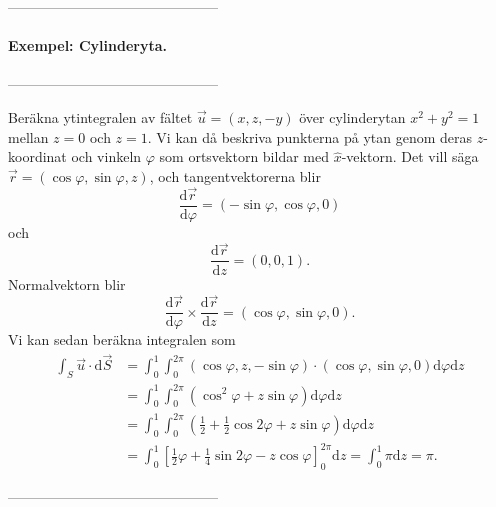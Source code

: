 \documentclass[%
oneside,                 %
final,                   %
10pt]{article}
\begin{document}
---------------------------------------------

\paragraph{Exempel: Cylinderyta.}
---------------------------------------------

Beräkna ytintegralen av fältet $\vec{u} = (x,z,-y)$ över cylinderytan $x^2 + y^2 = 1$ mellan $z = 0$ och $z = 1$.  Vi kan då beskriva punkterna på ytan genom deras $z$-koordinat och vinkeln $\varphi$ som ortsvektorn bildar med $\hat{x}$-vektorn.  Det vill säga $\vec{r} = (\cos\varphi , \sin\varphi , z)$, och tangentvektorerna blir
\begin{equation}
  \frac{\mbox{d}\vec{r}}{\mbox{d} \varphi} = \left(-\sin\varphi , \cos \varphi ,
0\right)
\end{equation}
och
\begin{equation}
  \frac{\mbox{d}\vec{r}}{\mbox{d}z} = \left(0,0,1\right).
\end{equation}
Normalvektorn blir
\begin{equation}
  \frac{\mbox{d}\vec{r}}{\mbox{d} \varphi} \times 
\frac{\mbox{d}\vec{r}}{\mbox{d}z} = \left(\cos\varphi , \sin \varphi, 0\right).
\end{equation}
Vi kan sedan beräkna integralen som
\begin{align}
  \int_S \vec{u} \cdot \mbox{d}\vec{S} &= \int_0^1\int_0^{2\pi} \left(\cos\varphi,
z, -\sin\varphi\right) \cdot \left(\cos\varphi, \sin \varphi, 0\right)
\mbox{d}\varphi \mbox{d}z \nonumber \\
&= \int_0^1\int_0^{2\pi} \left(\cos^2\varphi + z
\sin\varphi\right) \mbox{d}\varphi\mbox{d}z \nonumber \\
&= \int_0^1 \int_0^{2\pi} \left(
\frac{1}{2} + \frac{1}{2}\cos 2\varphi + z\sin\varphi\right) \mbox{d}\varphi
\mbox{d}z \nonumber \\
&= \int_0^1 \left[\frac{1}{2}\varphi + \frac{1}{4}\sin2\varphi - z
\cos\varphi\right]_0^{2\pi} \mbox{d}z = \int_0^1 \pi \mbox{d}z = \pi.
\end{align}

---------------------------------------------






\printindex
\end{document}
